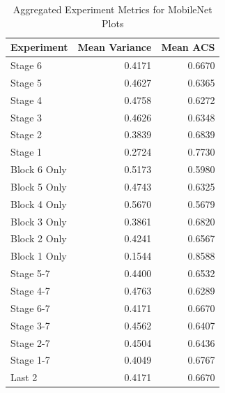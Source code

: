 \begin{table}
\caption{Aggregated Experiment Metrics for MobileNet Plots}
\label{tab:exp_plot_data_mobilenet}
\begin{tabular}{lrr}
\toprule
Experiment & Mean Variance & Mean ACS \\
\midrule
Stage 6 & 0.4171 & 0.6670 \\
Stage 5 & 0.4627 & 0.6365 \\
Stage 4 & 0.4758 & 0.6272 \\
Stage 3 & 0.4626 & 0.6348 \\
Stage 2 & 0.3839 & 0.6839 \\
Stage 1 & 0.2724 & 0.7730 \\
Block 6 Only & 0.5173 & 0.5980 \\
Block 5 Only & 0.4743 & 0.6325 \\
Block 4 Only & 0.5670 & 0.5679 \\
Block 3 Only & 0.3861 & 0.6820 \\
Block 2 Only & 0.4241 & 0.6567 \\
Block 1 Only & 0.1544 & 0.8588 \\
Stage 5-7 & 0.4400 & 0.6532 \\
Stage 4-7 & 0.4763 & 0.6289 \\
Stage 6-7 & 0.4171 & 0.6670 \\
Stage 3-7 & 0.4562 & 0.6407 \\
Stage 2-7 & 0.4504 & 0.6436 \\
Stage 1-7 & 0.4049 & 0.6767 \\
Last 2 & 0.4171 & 0.6670 \\
\bottomrule
\end{tabular}
\end{table}
